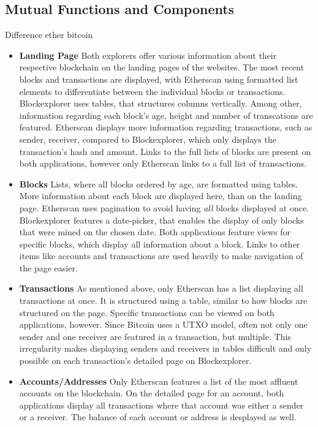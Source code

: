 \subsection{Mutual Functions and Components}
Difference ether bitcoin
\begin{itemize}
\item \textbf{Landing Page}
Both explorers offer various information about their respective blockchain on the landing pages of the websites. The most recent blocks and transactions are displayed, with Etherscan using formatted list elements to differentiate between the individual blocks or transactions. Blockexplorer uses tables, that structures columns vertically. Among other, information regarding each block's age, height and number of transcations are featured. Etherscan displays more information regarding transactions, such as sender, receiver, compared to Blockexplorer, which only displays the transaction's hash and amount. Links to the full lists of blocks are present on both applications, however only Etherscan links to a full list of transactions.
\item \textbf{Blocks}
Lists, where all blocks ordered by age, are formatted using tables. More information about each block are displayed here, than on the landing page. Etherscan uses pagination to avoid having \emph{all} blocks displayed at once. Blockexplorer features a date-picker, that enables the display of only blocks that were mined on the chosen date. Both applications feature views for specific blocks, which display all information about a block. Links to other items like accounts and transactions are used heavily to make navigation of the page easier.
\item \textbf{Transactions}
As mentioned above, only Etherscan has a list displaying all transactions at once. It is structured using a table, similar to how blocks are structured on the page. Specific transactions can be viewed on both applications, however. Since Bitcoin uses a UTXO model, often not only one sender and one receiver are featured in a transaction, but multiple. This irregularity makes displaying senders and receivers in tables difficult and only possible on each transaction's detailed page on Blockexplorer.
\item \textbf{Accounts/Addresses}
Only Etherscan features a list of the most affluent accounts on the blockchain. On the detailed page for an account, both applications display all transactions where that account was either a sender or a receiver. The balance of each account or address is desplayed as well.

\end{itemize}
